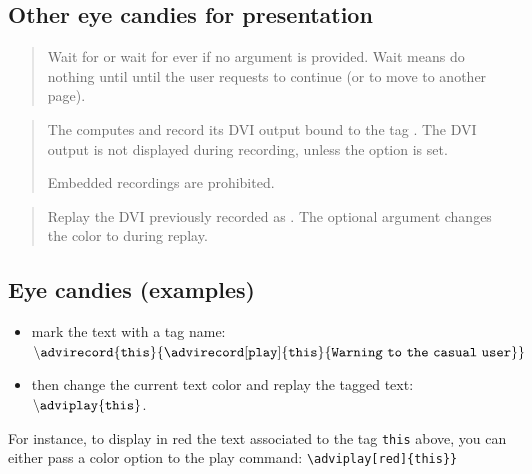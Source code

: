 \documentclass[12pt]{article}
\begin{document}
\newpage

\subsection* {Other eye candies for presentation}

\medskip\noindent
\docdef \adviwait{}
\begin{quote}
Wait for  or wait for ever if no argument is
provided. Wait means do nothing until until the user requests to
continue (or to move to another page).
\end{quote}

\medskip\noindent
\docdef \advirecord \doctt{[play]}
\begin{quote}
The computes  and record its DVI output bound to the tag
. The DVI output is not displayed during recording, unless the
option  is set.

Embedded recordings are prohibited. 
\end{quote}

\medskip\noindent
\docdef \adviplay{}
\begin{quote}
Replay the DVI previously recorded as .
The optional argument changes the color to  during replay. 
\end{quote}

\newpage

\subsection* {Eye candies (examples)}

\begin{itemize}
   \item mark the text with a tag name:\\
     $\tt \backslash advirecord\{this\}
      \{\advirecord[play]{this}{Warning~to~the~casual~user}\}$

   \item then change the current text color and replay the tagged text:\\
  $\tt{\backslash}adviplay\{this\}$.
\end{itemize}


\noindent
For instance, to display in red the text associated to the tag
{\tt this} above, you can either pass a color option to the play command:
\verb+\adviplay[red]{this}}+\\
\adviwait%
\textcolor {c1}{}\adviwait
{}\adviwait
\end{document}
